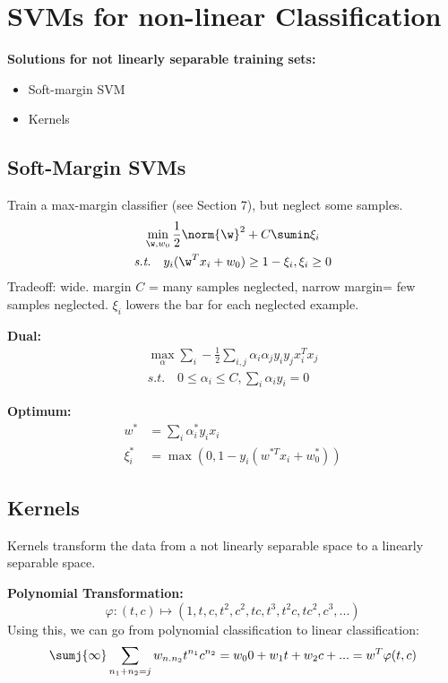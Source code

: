 \section{SVMs for non-linear Classification}
\textbf{Solutions for not linearly separable training sets:}
\begin{itemize}
	\item Soft-margin SVM
	\item Kernels
\end{itemize}


\subsection{Soft-Margin SVMs}
Train a max-margin classifier (see Section 7), but neglect some samples.
\begin{equation*}
	\begin{gathered}
		\min_{\w, w_0} \frac{1}{2}\norm{\w}^2 + C\sumin\xi_i \\
		\textit{s.t.}\quad y_i(\w^Tx_i + w_0) \geq 1 - \xi_i, \xi_i \geq 0
	\end{gathered}
\end{equation*}
Tradeoff: wide. margin $C$ = many samples neglected, narrow margin= few samples neglected. $\xi_i$ lowers the bar for each neglected example.

\textbf{Dual: }
\begin{equation*}
	\begin{gathered}
		\max_\alpha \sum_i - \frac{1}{2}\sum_{i, j}\alpha_i\alpha_j y_i y_j x_i^Tx_j \\
		\textit{s.t.} \quad 0\leq \alpha_i\leq C, \sum_i\alpha_i y_i = 0
	\end{gathered}
\end{equation*}

\textbf{Optimum: }
\begin{align*}
	w^* &= \sum_i \alpha_i^* y_ix_i \\
	\xi_i^*	&= \max(0, 1-y_i(w^{*T} x_i + w_0^*))
\end{align*}


\subsection{Kernels}
Kernels transform the data from a not linearly separable space to a linearly separable space.

\textbf{Polynomial Transformation: }
$$
	\varphi: (t,c) \mapsto (1, t, c, t^2, c^2, tc, t^3, t^2c, tc^2, c^3, ...)
$$
Using this, we can go from polynomial classification to linear classification: 
$$
	\sumj{\infty}\sum_{n_1 + n_2 = j} w_{n.n_2}t^{n_1}c^{n_2} = w_00 + w_1t + w_2c + ... = w^T\varphi(t,c)
$$

